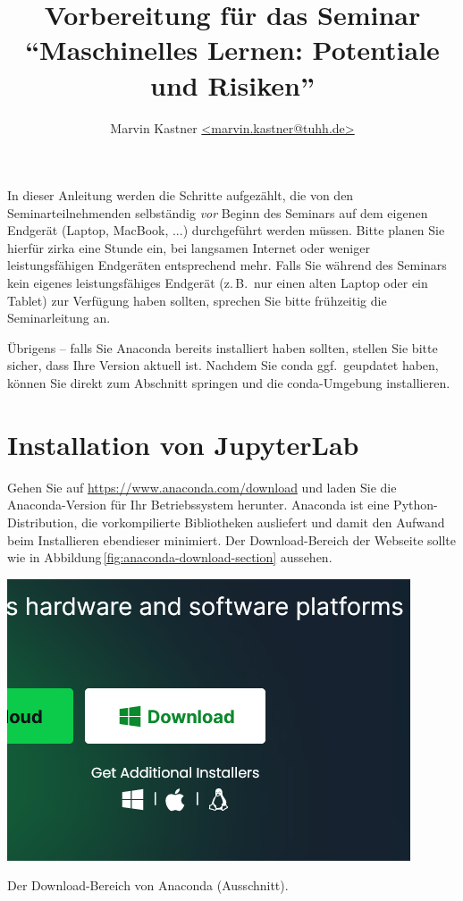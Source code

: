 \documentclass[nobib]{tufte-handout}
\title{Vorbereitung für das Seminar\\
\enquote{Maschinelles Lernen: Potentiale und Risiken}}
\author{Marvin Kastner \href{mailto:marvin.kastner@tuhh.de}{<marvin.kastner@tuhh.de>}}
\begin{document}
\maketitle%

In dieser Anleitung werden die Schritte aufgezählt, die von den Seminarteilnehmenden selbständig \emph{vor} Beginn des Seminars auf dem eigenen Endgerät (Laptop, MacBook, ...) durchgeführt werden müssen.
Bitte planen Sie hierfür zirka eine Stunde ein, bei langsamen Internet oder weniger leistungsfähigen Endgeräten entsprechend mehr.
Falls Sie während des Seminars kein eigenes leistungsfähiges Endgerät (z.\,B.\ nur einen alten Laptop oder ein Tablet) zur Verfügung haben sollten, sprechen Sie bitte frühzeitig die Seminarleitung an.

Übrigens -- falls Sie Anaconda bereits installiert haben sollten, stellen Sie bitte sicher, dass Ihre Version aktuell ist.
Nachdem Sie conda ggf.\ geupdatet haben, können Sie direkt zum Abschnitt \emph{} springen und die conda-Umgebung installieren.


\section{Installation von JupyterLab}

Gehen Sie auf
\url{https://www.anaconda.com/download} 
und laden Sie die Anaconda-Version für Ihr Betriebssystem herunter.
Anaconda ist eine Python-Distribution, die vorkompilierte Bibliotheken ausliefert und damit den Aufwand beim Installieren ebendieser minimiert.
Der Download-Bereich der Webseite sollte wie in Abbildung\,\ref{fig:anaconda-download-section} aussehen.

\begin{marginfigure}
  \includegraphics{anaconda_download_section}
  \caption{Der Download-Bereich von Anaconda (Ausschnitt).}%
\label{fig:anaconda-download-section}
\end{marginfigure}
\end{document}
